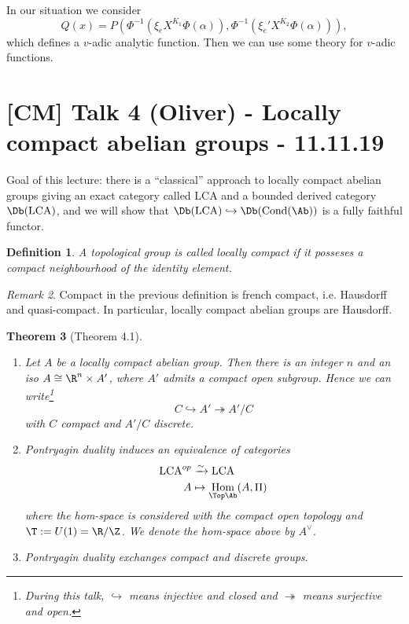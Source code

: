 \documentclass[A4paper, british]{amsart}
\theoremstyle{darkgreentheorem}
\newtheorem{thm}{Theorem}[section]
\theoremstyle{darkbluedefinition}
\newtheorem{defn}[thm]{Definition}
\theoremstyle{darkredexample}
\theoremstyle{remark}
\newtheorem{rem}[thm]{Remark}
\DeclareMathOperator{\Hom}{Hom}
\DeclareMathOperator{\Cond}{Cond}
\newcommand{\1}{\mathbbm{1}}
\newcommand{\dual}{^{\vee}}
\newcommand{\tms}{\times}
\newcommand{\epi}{\twoheadrightarrow}
\newcommand{\mono}{\hookrightarrow}
\newcommand{\LCA}{\mathrm{LCA}}
\begin{document}
In our situation we consider
\[ Q(x)=P(\Phi^{-1}(\xi_{e}X^{K_{1}}\Phi(\alpha)),\Phi^{-1}(\xi_{e}'X^{K_{2}}\Phi(\alpha))),\]
which defines a $v$-adic analytic function.
Then we can use some theory for $v$-adic functions.

\section{[CM] Talk 4 (Oliver) - Locally compact abelian groups - 11.11.19}

Goal of this lecture: there is a ``classical'' approach to locally compact abelian groups giving an exact category called $\LCA$ and a bounded derived category $\Db(\LCA)$, and we will show that $\Db(\LCA)\mono \Db(\Cond(\Ab))$ is a fully faithful functor.

\begin{defn}
    A topological group is called \textit{locally compact} if it posseses a compact neighbourhood of the identity element.
\end{defn}

\begin{rem}
    Compact in the previous definition is french compact, i.e. Hausdorff and quasi-compact.
    In particular, locally compact abelian groups are Hausdorff.
\end{rem}

\begin{thm}[Theorem 4.1]
    \begin{enumerate}[label=\roman*)]
	\item Let $A$ be a locally compact abelian group.
	    Then there is an integer $n$ and an iso $A\cong \R^{n}\tms A'$, where $A'$ admits a compact open subgroup.
	    Hence we can write\footnote{During this talk, $\mono$ means injective and closed and $\epi$ means surjective and open.}
	    \[ C\mono A'\epi A'/C \]
	    with $C$ compact and $A'/C$ discrete.
	\item Pontryagin duality induces an equivalence of categories
	    \begin{align*}
		\LCA^{op}&\xrightarrow{\sim} \LCA \\
		A & \mapsto \Hom_{\Top\Ab}(A,\Pi)
	    \end{align*}
	    where the hom-space is considered with the compact open topology and $\T:=U(1)=\R/\Z$.
	    We denote the hom-space above by $A\dual$.
	\item Pontryagin duality exchanges compact and discrete groups.
    \end{enumerate}
\end{thm}
\end{document}
